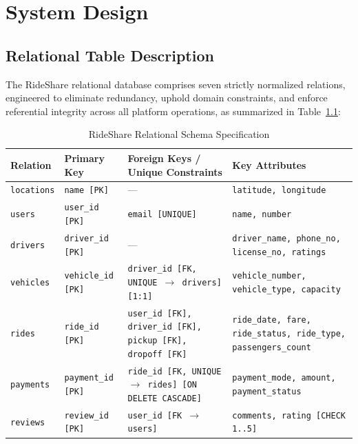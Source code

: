 \chapter{System Design}

\section{Relational Table Description}
The RideShare relational database comprises seven strictly normalized relations, engineered to eliminate redundancy, uphold domain constraints, and enforce referential integrity across all platform operations, as summarized in Table~\ref{tab:schema}:

\begin{table}[H]
\centering
\small
\caption{RideShare Relational Schema Specification}
\label{tab:schema}
\begin{tabular}{|p{2.0cm}|p{2.2cm}|p{4.8cm}|p{4.8cm}|}
\hline
\rowcolor{headerblue}
\color{white}\textbf{Relation} & \color{white}\textbf{Primary Key} & \color{white}\textbf{Foreign Keys / Unique Constraints} & \color{white}\textbf{Key Attributes} \\
\hline
\rowcolor{rowgray}
\texttt{locations} & \texttt{name [PK]} & --- & \texttt{latitude, longitude} \\
\hline
\texttt{users} & \texttt{user\_id [PK]} & \texttt{email [UNIQUE]} & \texttt{name, number} \\
\hline
\rowcolor{rowgray}
\texttt{drivers} & \texttt{driver\_id [PK]} & --- & \texttt{driver\_name, phone\_no, license\_no, ratings} \\
\hline
\texttt{vehicles} & \texttt{vehicle\_id [PK]} & \texttt{driver\_id [FK, UNIQUE $\rightarrow$ drivers] [1:1]} & \texttt{vehicle\_number, vehicle\_type, capacity} \\
\hline
\rowcolor{rowgray}
\texttt{rides} & \texttt{ride\_id [PK]} & \texttt{user\_id [FK], driver\_id [FK], pickup [FK], dropoff [FK]} & \texttt{ride\_date, fare, ride\_status, ride\_type, passengers\_count} \\
\hline
\texttt{payments} & \texttt{payment\_id [PK]} & \texttt{ride\_id [FK, UNIQUE $\rightarrow$ rides] [ON DELETE CASCADE]} & \texttt{payment\_mode, amount, payment\_status} \\
\hline
\rowcolor{rowgray}
\texttt{reviews} & \texttt{review\_id [PK]} & \texttt{user\_id [FK $\rightarrow$ users]} & \texttt{comments, rating [CHECK 1..5]} \\
\hline
\end{tabular}
\end{table}

